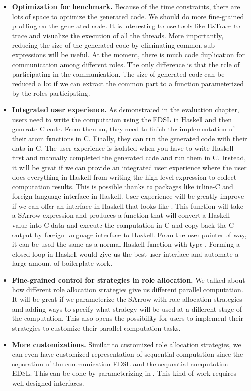 \begin{itemize}
    \item \textbf{Optimization for benchmark.} Because of the time constraints, there are lots of space to optimize the generated code. We should do more fine-grained profiling on the generated code. It is interesting to use tools like EzTrace to trace and visualize the execution of all the threads. More importantly, reducing the size of the generated code by eliminating common sub-expressions will be useful. At the moment, there is much code duplication for communication among different roles. The only difference is that the role of participating in the communication. The size of generated code can be reduced a lot if we can extract the common part to a function parameterized by the roles participating. 
    \item \textbf{Integrated user experience.} As demonstrated in the evaluation chapter, users need to write the computation using the EDSL in Haskell and then generate C code. From then on, they need to finish the implementation of their atom functions in C. Finally, they can run the generated code with their data in C. The user experience is isolated when you have to write Haskell first and manually completed the generated code and run them in C. Instead, it will be great if we can provide an integrated user experience where the user does everything in Haskell from writing the high-level expression to collect computation results. This is possible thanks to packages like inline-C and foreign language interface in Haskell. User experience will be greatly improve if we can offer an interface in Haskell that looks like . This function will take a SArrow expression and produces a function that will convert a Haskell value into C data and execute the computation in C and copy back the C output by foreign language interface to Haskell. From the user pointer of way, it can be used the same as a normal Haskell function with type . Forming a closed loop in Haskell would give us the best user interface and automate a large amount of boilerplate work.
    \item \textbf{Fine-grained control for strategies in role allocation.} We talked about how different role allocation strategies give us different parallel computation. It will be great if we parameterize the SArrow with role allocation strategies and adding ways to specify what strategy will be used at a different stage of the computation. This also opens the possibility for users to implement their strategies to customize their parallel computation tasks.
    \item \textbf{More customizations. } Similar to customized role allocation strategies, we can even have customized representation of sequential computation since the separation of the communication EDSL and the sequential computation EDSL. This can be done by parameterizing  in . This kind of work requires well-designed interfaces.
\end{itemize}